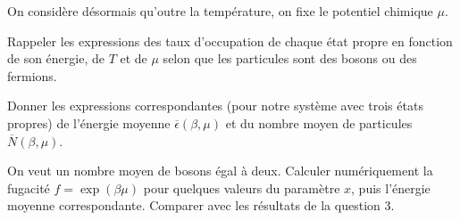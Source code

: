 \documentclass[utf8, 11pt]{feuille}
\begin{document}
\medskip

On considère désormais qu'outre la température, on fixe le potentiel chimique $\mu$.

\medskip

\question
Rappeler les expressions des taux d'occupation de chaque état propre en fonction de son énergie, de $T$ et de $\mu$ selon que les particules sont des bosons ou des fermions.

\question
Donner les expressions correspondantes (pour notre système avec trois états propres) de l'énergie moyenne $\overline{\epsilon}(\beta,\mu)$ et du nombre moyen de particules $\overline{N}(\beta,\mu)$.

\question
On veut un nombre moyen de bosons égal à deux. Calculer numériquement la fugacité $f=\exp(\beta \mu)$ pour quelques valeurs du paramètre $x$, puis l'énergie moyenne correspondante. Comparer avec les résultats de la question 3.  
\end{document}
